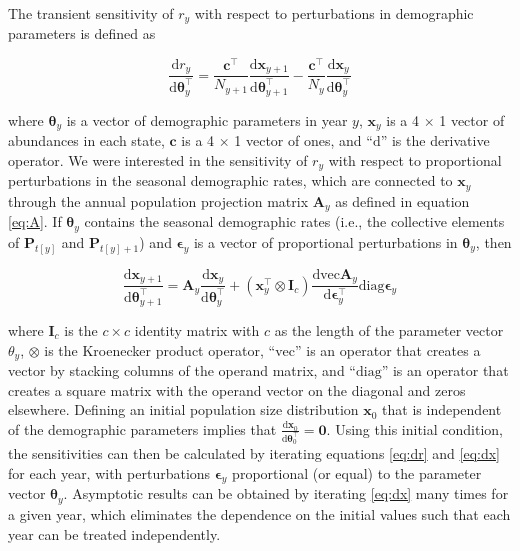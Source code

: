 \documentclass[11pt]{article}
\begin{document}
The transient sensitivity of $r_y$ with respect to perturbations in demographic parameters
is defined as
%
\begin{linenomath*}
\begin{equation} \label{eq:dr}
\frac{\textrm{d}r_y}{\textrm{d}\boldsymbol\theta_y^\top} = 
    \frac{\mathbf{c}^\top}{N_{y+1}} \frac{\textrm{d}\mathbf{x}_{y+1}}
            {\textrm{d}\boldsymbol\theta_{y+1}^\top}-
        \frac{\mathbf{c}^\top}{N_{y}} \frac{\textrm{d}\mathbf{x}_y}
            {\textrm{d}\boldsymbol\theta_y^\top}
\end{equation}
\end{linenomath*}
%
where $\boldsymbol\theta_y$ is a vector of demographic parameters in year $y$, 
$\mathbf{x}_y$ is a 4 $\times$ 1 vector of abundances in each state,
$\mathbf{c}$ is a 4 $\times$ 1 vector of ones,
and ``$\textrm{d}$'' is the derivative operator.
We were interested in the sensitivity of $r_y$ with respect to proportional 
perturbations in the seasonal demographic rates,
which are connected to $\mathbf{x}_y$ through the annual population projection matrix
$\mathbf{A}_y$ as defined in equation \ref{eq:A}.
If $\boldsymbol\theta_y$ contains the seasonal demographic rates 
(i.e., the collective elements of $\mathbf{P}_{t[y]}$ and $\mathbf{P}_{t[y]+1}$)
and $\boldsymbol\epsilon_y$ is a vector of proportional perturbations in
$\boldsymbol\theta_y$,
then 
%
\begin{linenomath*}
\begin{equation} \label{eq:dx}
\frac{\textrm{d}\mathbf{x}_{y+1}}{\textrm{d}\boldsymbol\theta_{y+1}^\top} = 
    \mathbf{A}_y \frac{\textrm{d}\mathbf{x}_{y}}{\textrm{d}\boldsymbol\theta_y^\top}+
        \left(\mathbf{x}_{y}^\top \otimes \mathbf{I}_c \right)
            \frac{\textrm{dvec}\mathbf{A}_y}{\textrm{d}\boldsymbol\epsilon_y^\top}
                \textrm{diag}\boldsymbol\epsilon_y
\end{equation}
\end{linenomath*}
%
where $\mathbf{I}_c$ is the $c \times c$ identity matrix with $c$ as the length
of the parameter vector $\theta_y$,
$\otimes$ is the Kroenecker product operator,
``$\textrm{vec}$'' is an operator that creates a vector 
by stacking columns of the operand matrix,
and ``$\textrm{diag}$'' is an operator that creates a square matrix with the operand vector on
the diagonal and zeros elsewhere. 
Defining an initial population size distribution $\mathbf{x}_0$ 
that is independent of the demographic parameters implies that 
$\frac{\textrm{d}\mathbf{x}_0}{\textrm{d}\boldsymbol\theta_0^\top} = \mathbf{0}$.
Using this initial condition,
the sensitivities can then be calculated by iterating equations \ref{eq:dr} and \ref{eq:dx}
for each year, with perturbations $\boldsymbol\epsilon_y$ proportional (or equal)
to the parameter vector $\boldsymbol\theta_y$.
Asymptotic results can be obtained by iterating \ref{eq:dx} many times for a given year,
which eliminates the dependence on the initial values such that each year can be treated
independently. 
\end{document}
